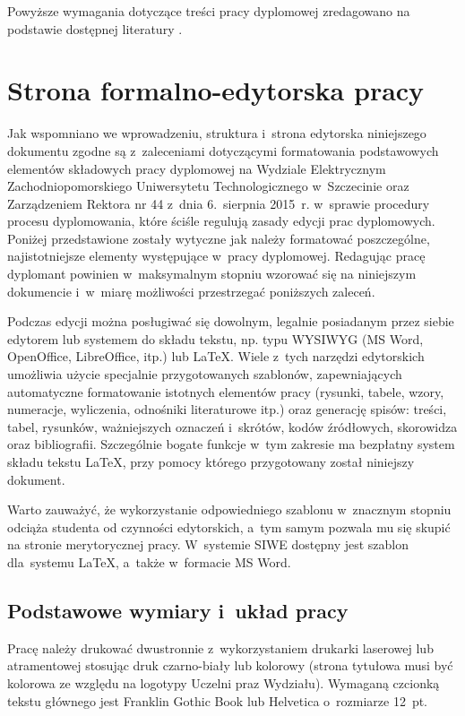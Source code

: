 \documentclass[skorowidz,skroty]{dyplomWEZUT}
\begin{document}
\noindent Powyższe wymagania dotyczące treści pracy dyplomowej zredagowano na podstawie dostępnej literatury
\cite{Boc2003,Honczarenko2000,Opoka2001,Pioterek1997,Zenderowski2004}.

\chapter{Strona formalno-edytorska pracy}\label{chap:editing}

Jak wspomniano we wprowadzeniu, struktura i~strona edytorska niniejszego dokumentu zgodne są z~zaleceniami dotyczącymi formatowania podstawowych elementów składowych pracy dyplomowej na Wydziale Elektrycznym Zachodniopomorskiego Uniwersytetu Technologicznego w~Szczecinie oraz Zarządzeniem Rektora nr 44 z~dnia 6.~sierpnia 2015~r. w~sprawie procedury procesu dyplomowania, które ściśle regulują zasady edycji prac dyplomowych. Poniżej przedstawione zostały wytyczne jak należy formatować poszczególne, najistotniejsze elementy występujące w~pracy dyplomowej. Redagując pracę dyplomant powinien w~maksymalnym stopniu wzorować się na niniejszym dokumencie i~w~miarę możliwości przestrzegać poniższych zaleceń.

Podczas edycji można posługiwać się dowolnym, legalnie posiadanym przez siebie edytorem lub systemem do składu tekstu, np. typu WYSIWYG (MS Word, OpenOffice, LibreOffice, itp.) lub LaTeX. Wiele z~tych narzędzi edytorskich umożliwia użycie specjalnie przygotowanych szablonów, zapewniających automatyczne formatowanie istotnych elementów pracy (rysunki, tabele, wzory, numeracje, wyliczenia, odnośniki literaturowe itp.) oraz generację spisów: treści, tabel, rysunków, ważniejszych oznaczeń i~skrótów, kodów źródłowych, skorowidza oraz bibliografii. Szczególnie bogate funkcje w~tym zakresie ma bezpłatny system składu tekstu LaTeX, przy pomocy którego przygotowany został niniejszy dokument.

Warto zauważyć, że wykorzystanie odpowiedniego szablonu w~znacznym stopniu odciąża studenta od czynności edytorskich, a~tym samym pozwala mu się skupić na stronie merytorycznej pracy. W~systemie SIWE dostępny jest szablon dla~systemu LaTeX, a~także w~formacie MS Word.

\section{Podstawowe wymiary i~układ pracy}\label{sec:wymiary}

Pracę należy drukować dwustronnie z~wykorzystaniem drukarki laserowej lub atramentowej stosując druk czarno-biały lub kolorowy (strona tytułowa musi być kolorowa ze względu na logotypy Uczelni praz Wydziału). Wymaganą czcionką tekstu głównego jest Franklin Gothic Book lub Helvetica o~rozmiarze 12~pt. 
\end{document}
